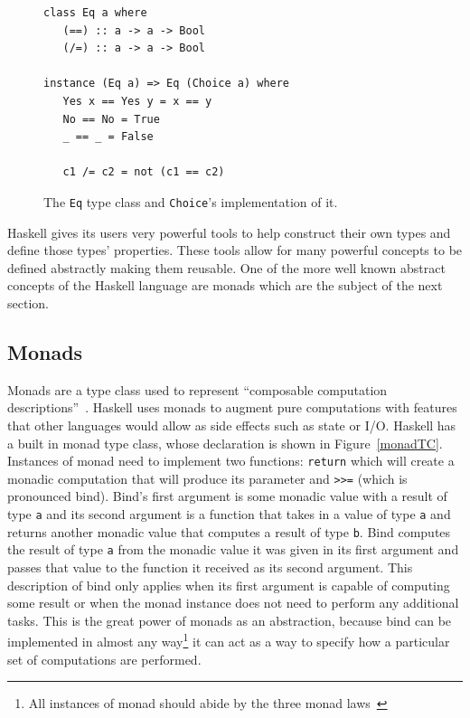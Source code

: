 \begin{figure}[t]
\begin{lstlisting}
class Eq a where
   (==) :: a -> a -> Bool
   (/=) :: a -> a -> Bool
	
instance (Eq a) => Eq (Choice a) where
   Yes x == Yes y = x == y
   No == No = True
   _ == _ = False
	
   c1 /= c2 = not (c1 == c2) 
\end{lstlisting}
\caption{The \texttt{Eq} type class and \texttt{Choice}'s implementation of it.}
\label{choiceEq}
\end{figure}

Haskell gives its users very powerful tools to help construct their own types and define those types' properties. These tools allow for many powerful concepts to be defined abstractly making them reusable. One of the more well known abstract concepts of the Haskell language are monads which are the subject of the next section.

\subsection{Monads}

Monads are a type class used to represent ``composable computation descriptions''~\citep{haskellWikiMonad}. Haskell uses monads to augment pure computations with features that other languages would allow as side effects such as state or I/O. Haskell has a built in monad type class, whose declaration is shown in Figure~\ref{monadTC}. Instances of monad need to implement two functions: \texttt{return} which will create a monadic computation that will produce its parameter and \texttt{>>=} (which is pronounced bind). Bind's first argument is some monadic value with a result of type \texttt{a} and its second argument is a function that takes in a value of type \texttt{a} and returns another monadic value that computes a result of type \texttt{b}. Bind computes the result of type \texttt{a} from the monadic value it was given in its first argument and passes that value to the function it received as its second argument. This description of bind only applies when its first argument is capable of computing some result or when the monad instance does not need to perform any additional tasks. This is the great power of monads as an abstraction, because bind can be implemented in almost any way\footnote{All instances of monad should abide by the three monad laws~\citep{wadler1995Monads}} it can act as a way to specify how a particular set of computations are performed. 


